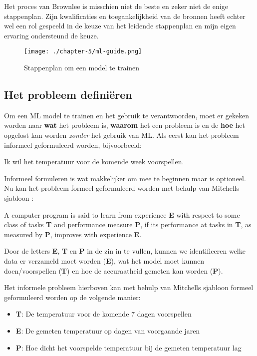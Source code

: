 Het proces van Brownlee is misschien niet de beste en zeker niet de enige stappenplan. Zijn kwalificaties en toegankelijkheid van de bronnen heeft echter wel een rol gespeeld in de keuze van het leidende stappenplan en mijn eigen ervaring ondersteund de keuze.

\begin{figure}[hbt!]
  \centering
  \texttt{[image: ./chapter-5/ml-guide.png]}
  \caption{Stappenplan om een model te trainen}
  \label{fig:ml-guide}
\end{figure}

\subsection{Het probleem definiëren}\label{subsec:het-probleem-definieren}
Om een ML model te trainen en het gebruik te verantwoorden, moet er gekeken worden naar \textbf{wat} het probleem is, \textbf{waarom} het een probleem is en de \textbf{hoe} het opgelost kan worden \textit{zonder} het gebruik van ML. Als eerst kan het probleem informeel geformuleerd worden, bijvoorbeeld:

\begin{quoting}
  \centering
  Ik wil het temperatuur voor de komende week voorspellen.
\end{quoting}

Informeel formuleren is wat makkelijker om mee te beginnen maar is optioneel. Nu kan het probleem formeel geformuleerd worden met behulp van Mitchells sjabloon \cite{machine-learning-mitchell}:

\begin{quoting}
  A computer program is said to learn from experience \textbf{E} with respect to some class of tasks \textbf{T} and performance measure \textbf{P}, if its performance at tasks in \textbf{T}, as measured by \textbf{P}, improves with experience \textbf{E}. 
\end{quoting}

Door de letters \textbf{E}, \textbf{T} en \textbf{P} in de zin in te vullen, kunnen we identificeren welke data er verzameld moet worden (\textbf{E}), wat het model moet kunnen doen/voorspellen (\textbf{T}) en hoe de accuraatheid gemeten kan worden (\textbf{P}).

Het informele probleem hierboven kan met behulp van Mitchells sjabloon formeel geformuleerd worden op de volgende manier:

\begin{itemize}
  \item \textbf{T}: De temperatuur voor de komende 7 dagen voorspellen
  \item \textbf{E}: De gemeten temperatuur op dagen van voorgaande jaren
  \item \textbf{P}: Hoe dicht het voorspelde temperatuur bij de gemeten temperatuur lag
\end{itemize}

